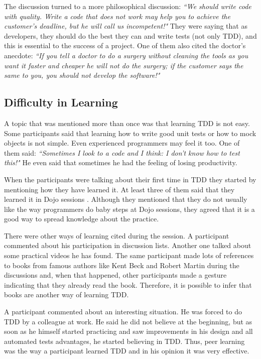The discussion turned to a more philosophical discussion: \textit{``We should
write code with quality. Write a code that does not work may help you to achieve
the customer's deadline, but he will call us incompetent!"} They were saying
that as developers, they should do the best they can and write tests (not only
TDD), and this is essential to the success of a project. One of them also cited
the doctor's anecdote: \textit{``If you tell a doctor to do a surgery without
cleaning the tools as you want it faster and cheaper he will not do the surgery;
if the customer says the same to you, you should not develop the software!"}

\subsection{Difficulty in Learning}

A topic that was mentioned more than once was that learning TDD is not easy.
Some participants said that learning how to write good unit tests or how to
mock objects is not simple. Even experienced programmers may feel it too.
One of them said: \textit{``Sometimes I look to a code and I think: I don't know
how to test this!"} He even said that sometimes he had the feeling of losing
productivity.

When the participants were talking about their first time in TDD they started by
mentioning how they have learned it. At least three of them said that they
learned it in Dojo sessions \cite{dojo}. Although they mentioned that they do not usually
like the way programmers do baby steps at Dojo sessions, they agreed that it is
a good way to spread knowledge about the practice.

There were other ways of learning cited during the session. A participant
commented about his participation in discussion lists. Another one talked about
some practical videos he has found. The same participant made lots of references
to books from famous authors like Kent Beck and Robert Martin during the
discussions and, when that happened, other participants made a gesture
indicating that they already read the book. Therefore, it is possible to infer
that books are another way of learning TDD.

A participant commented about an interesting situation. He was forced to do TDD
by a colleague at work. He said he did not believe at the beginning, but as soon
as he himself started practicing and saw improvements in his design and all
automated tests advantages, he started believing in TDD. Thus, peer learning
was the way a participant learned TDD and in his opinion it was very effective.


